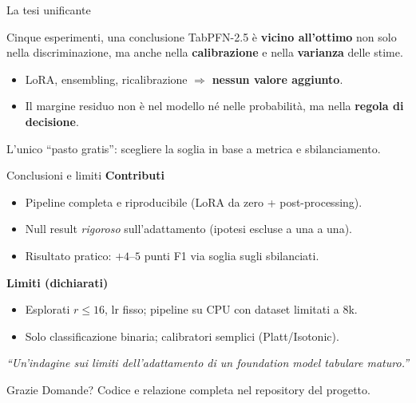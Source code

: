 \documentclass[11pt,aspectratio=169]{beamer}
\begin{document}
\begin{frame}{La tesi unificante}
\begin{block}{Cinque esperimenti, una conclusione}
TabPFN-2.5 è \textbf{vicino all'ottimo} non solo nella discriminazione, ma anche
nella \textbf{calibrazione} e nella \textbf{varianza} delle stime.
\end{block}
\vfill
\begin{itemize}
  \item LoRA, ensembling, ricalibrazione $\Rightarrow$ \textbf{nessun valore aggiunto}.
  \item Il margine residuo non è nel modello né nelle probabilità, ma nella
  \textbf{regola di decisione}.
\end{itemize}
\vfill
\centering
\alert{L'unico ``pasto gratis'': scegliere la soglia in base a metrica e
sbilanciamento.}
\end{frame}

\begin{frame}{Conclusioni e limiti}
\textbf{Contributi}
\begin{itemize}
  \item Pipeline completa e riproducibile (LoRA da zero + post-processing).
  \item Null result \emph{rigoroso} sull'adattamento (ipotesi escluse a una a una).
  \item Risultato pratico: $+4$--$5$ punti F1 via soglia sugli sbilanciati.
\end{itemize}
\vfill
\textbf{Limiti (dichiarati)}
\begin{itemize}
  \item Esplorati $r \le 16$, lr fisso; pipeline su CPU con dataset limitati a $8$k.
  \item Solo classificazione binaria; calibratori semplici (Platt/Isotonic).
\end{itemize}
\vfill
\centering\small
\emph{``Un'indagine sui limiti dell'adattamento di un foundation model tabulare maturo.''}
\end{frame}

\begin{frame}{Grazie}
\centering
\Large Domande?
\vfill
\normalsize
Codice e relazione completa nel repository del progetto.
\end{frame}
\end{document}
